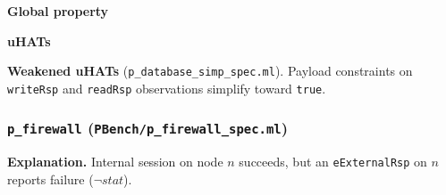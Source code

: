 \textbf{Global property}
\vspace{-.35cm}\par{}
\vspace{-.4cm}\par\nobreak\noindent
\textbf{uHATs}
\vspace{-.35cm}\par{}
\vspace{-.4cm}\par\nobreak\noindent
\textbf{Weakened uHATs} (\texttt{p\_database\_simp\_spec.ml}).
Payload constraints on \texttt{writeRsp} and \texttt{readRsp} observations simplify toward \texttt{true}.

\subsubsection*{\texttt{p\_firewall} (\texttt{PBench/p\_firewall\_spec.ml})}
\textbf{Explanation.}
Internal session on node \(n\) succeeds, but an \texttt{eExternalRsp} on \(n\) reports failure (\(\neg\mathit{stat}\)).

